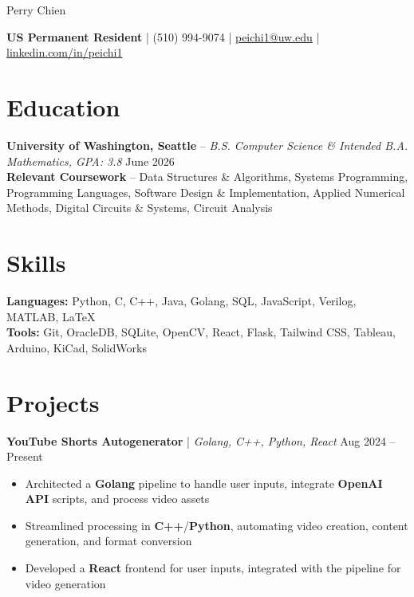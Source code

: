 \documentclass[11pt]{article}       %
\begin{document}
\centerline{\Huge Perry Chien}

\vspace{5pt}



\centerline{{\textbf{US Permanent Resident}} | {(510) 994-9074} | \href{mailto:peichi1@uw.edu}{peichi1@uw.edu} | \href{https://www.linkedin.com/in/peichi1/}{linkedin.com/in/peichi1}}

\vspace{-10pt}



\section*{Education}
\textbf{University of Washington, Seattle} -- \textit{B.S. Computer Science \& Intended B.A. Mathematics, GPA: 3.8} \hfill June 2026 \\
\textbf{{Relevant Coursework}} -- Data Structures \& Algorithms, Systems Programming, Programming Languages, Software Design \& Implementation, Applied Numerical Methods, Digital Circuits \& Systems, Circuit Analysis \\

\vspace{-6.5pt}



\section*{Skills}
\textbf{Languages:} Python, C, C++, Java, Golang, SQL, JavaScript, Verilog, MATLAB, \LaTeX \\
\textbf{Tools:} Git, OracleDB, SQLite, OpenCV, React, Flask, Tailwind CSS, Tableau, Arduino, KiCad, SolidWorks \\

\vspace{-6.5pt}





\section*{Projects}
\textbf{YouTube Shorts Autogenerator} | \textit{Golang, C++, Python, React} \hfill Aug 2024 -- Present \\
\vspace{-9pt}
\begin{itemize}
  \item Architected a \textbf{Golang} pipeline to handle user inputs, integrate \textbf{OpenAI API} scripts, and process video assets
  \item Streamlined processing in \textbf{C++}/\textbf{Python}, automating video creation, content generation, and format conversion
  \item Developed a \textbf{React} frontend for user inputs, integrated with the pipeline for video generation
\end{itemize}
\end{document}

